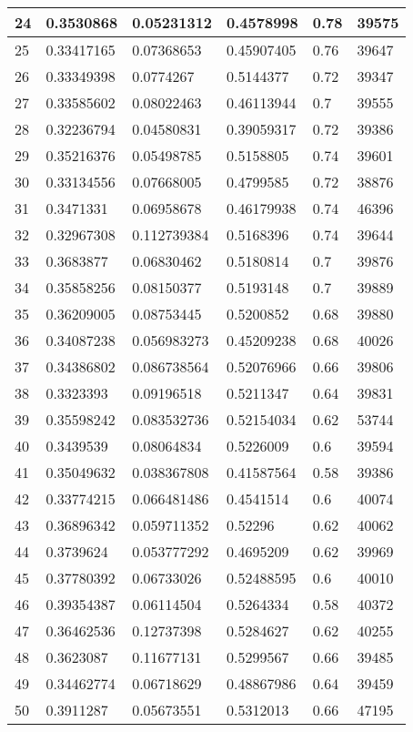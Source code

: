 \begin{longtable}{|l|l|l|l|l|l|}
24 & 0.3530868 & 0.05231312 & 0.4578998 & 0.78 & 39575 \\ \hline 
25 & 0.33417165 & 0.07368653 & 0.45907405 & 0.76 & 39647 \\ \hline 
26 & 0.33349398 & 0.0774267 & 0.5144377 & 0.72 & 39347 \\ \hline 
27 & 0.33585602 & 0.08022463 & 0.46113944 & 0.7 & 39555 \\ \hline 
28 & 0.32236794 & 0.04580831 & 0.39059317 & 0.72 & 39386 \\ \hline 
29 & 0.35216376 & 0.05498785 & 0.5158805 & 0.74 & 39601 \\ \hline 
30 & 0.33134556 & 0.07668005 & 0.4799585 & 0.72 & 38876 \\ \hline 
31 & 0.3471331 & 0.06958678 & 0.46179938 & 0.74 & 46396 \\ \hline 
32 & 0.32967308 & 0.112739384 & 0.5168396 & 0.74 & 39644 \\ \hline 
33 & 0.3683877 & 0.06830462 & 0.5180814 & 0.7 & 39876 \\ \hline 
34 & 0.35858256 & 0.08150377 & 0.5193148 & 0.7 & 39889 \\ \hline 
35 & 0.36209005 & 0.08753445 & 0.5200852 & 0.68 & 39880 \\ \hline 
36 & 0.34087238 & 0.056983273 & 0.45209238 & 0.68 & 40026 \\ \hline 
37 & 0.34386802 & 0.086738564 & 0.52076966 & 0.66 & 39806 \\ \hline 
38 & 0.3323393 & 0.09196518 & 0.5211347 & 0.64 & 39831 \\ \hline 
39 & 0.35598242 & 0.083532736 & 0.52154034 & 0.62 & 53744 \\ \hline 
40 & 0.3439539 & 0.08064834 & 0.5226009 & 0.6 & 39594 \\ \hline 
41 & 0.35049632 & 0.038367808 & 0.41587564 & 0.58 & 39386 \\ \hline 
42 & 0.33774215 & 0.066481486 & 0.4541514 & 0.6 & 40074 \\ \hline 
43 & 0.36896342 & 0.059711352 & 0.52296 & 0.62 & 40062 \\ \hline 
44 & 0.3739624 & 0.053777292 & 0.4695209 & 0.62 & 39969 \\ \hline 
45 & 0.37780392 & 0.06733026 & 0.52488595 & 0.6 & 40010 \\ \hline 
46 & 0.39354387 & 0.06114504 & 0.5264334 & 0.58 & 40372 \\ \hline 
47 & 0.36462536 & 0.12737398 & 0.5284627 & 0.62 & 40255 \\ \hline 
48 & 0.3623087 & 0.11677131 & 0.5299567 & 0.66 & 39485 \\ \hline 
49 & 0.34462774 & 0.06718629 & 0.48867986 & 0.64 & 39459 \\ \hline 
50 & 0.3911287 & 0.05673551 & 0.5312013 & 0.66 & 47195 \\ \hline 
\end{longtable}